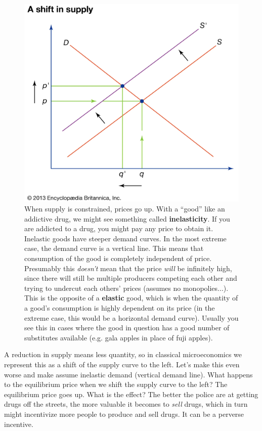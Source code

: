 \documentclass[11pt]{article}
\begin{document}
\begin{figure}[h]
    \centering
    \includegraphics*[width=4.5in]{supplyshift.png}
    \caption{When supply is constrained, prices go up. With a ``good'' like an addictive drug, we might see something called {\bf inelasticity}. If you are addicted to a drug, you might pay any price to obtain it. Inelastic goods have steeper demand curves. In the most extreme case, the demand curve is a vertical line. This means that consumption of the good is completely independent of price. Presumably this {\it doesn't} mean that the price {\it will} be infinitely high, since there will still be multiple producers competing each other and trying to undercut each others' prices (assumes no monopolies...). This is the opposite of a {\bf elastic} good, which is when the quantity of a good's consumption is highly dependent on its price (in the extreme case, this would be a horizontal demand curve). Usually you see this in cases where the good in question has a good number of substitutes available (e.g. gala apples in place of fuji apples). }
    \label{fig:sshift}
\end{figure}

A reduction in supply means less quantity, so in classical microeconomics we represent this as a shift of the supply curve to the left. Let's make this even worse and make assume inelastic demand (vertical demand line). What happens to the equilibrium price when we shift the supply curve to the left? The equilibrium price goes up. What is the effect? The better the police are at getting drugs off the streets, the more valuable it becomes to {\it sell} drugs, which in turn might incentivize more people to produce and sell drugs. It can be a perverse incentive. 
\end{document}
